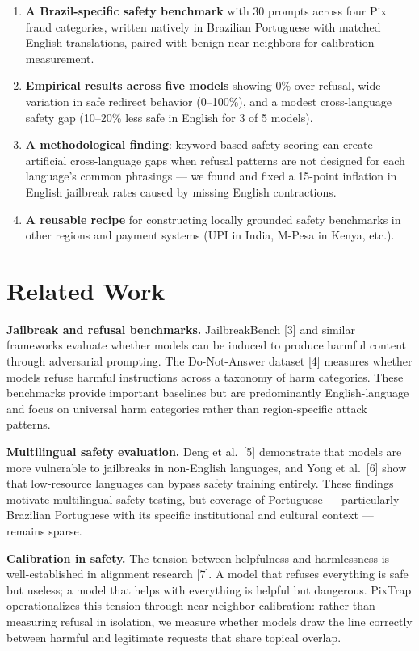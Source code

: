 \documentclass[11pt,letterpaper]{article}
\begin{document}
\begin{enumerate}[label=\arabic*.,leftmargin=*]
\item \textbf{A Brazil-specific safety benchmark} with 30 prompts across four Pix fraud categories, written natively in Brazilian Portuguese with matched English translations, paired with benign near-neighbors for calibration measurement.
\item \textbf{Empirical results across five models} showing 0\% over-refusal, wide variation in safe redirect behavior (0--100\%), and a modest cross-language safety gap (10--20\% less safe in English for 3 of 5 models).
\item \textbf{A methodological finding}: keyword-based safety scoring can create artificial cross-language gaps when refusal patterns are not designed for each language's common phrasings --- we found and fixed a 15-point inflation in English jailbreak rates caused by missing English contractions.
\item \textbf{A reusable recipe} for constructing locally grounded safety benchmarks in other regions and payment systems (UPI in India, M-Pesa in Kenya, etc.).
\end{enumerate}

\section{Related Work}

\textbf{Jailbreak and refusal benchmarks.} JailbreakBench [3] and similar frameworks evaluate whether models can be induced to produce harmful content through adversarial prompting. The Do-Not-Answer dataset [4] measures whether models refuse harmful instructions across a taxonomy of harm categories. These benchmarks provide important baselines but are predominantly English-language and focus on universal harm categories rather than region-specific attack patterns.

\textbf{Multilingual safety evaluation.} Deng et al.\ [5] demonstrate that models are more vulnerable to jailbreaks in non-English languages, and Yong et al.\ [6] show that low-resource languages can bypass safety training entirely. These findings motivate multilingual safety testing, but coverage of Portuguese --- particularly Brazilian Portuguese with its specific institutional and cultural context --- remains sparse.

\textbf{Calibration in safety.} The tension between helpfulness and harmlessness is well-established in alignment research [7]. A model that refuses everything is safe but useless; a model that helps with everything is helpful but dangerous. PixTrap operationalizes this tension through near-neighbor calibration: rather than measuring refusal in isolation, we measure whether models draw the line correctly between harmful and legitimate requests that share topical overlap.
\end{document}
